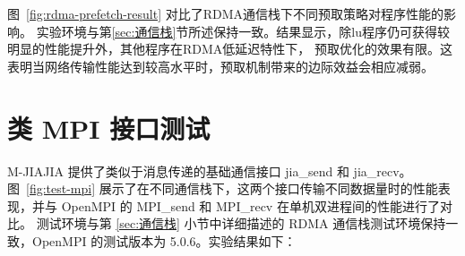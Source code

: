 {    图~\ref{fig:rdma-prefetch-result} 对比了RDMA通信栈下不同预取策略对程序性能的影响。
    实验环境与第\ref{sec:通信栈}节所述保持一致。结果显示，除lu程序仍可获得较明显的性能提升外，其他程序在RDMA低延迟特性下，
    预取优化的效果有限。这表明当网络传输性能达到较高水平时，预取机制带来的边际效益会相应减弱。

    \section{类 MPI 接口测试}\label{sec:类 MPI 接口测试}
    M-JIAJIA 提供了类似于消息传递的基础通信接口 jia\_send 和 jia\_recv。
    图~\ref{fig:test-mpi} 展示了在不同通信栈下，这两个接口传输不同数据量时的性能表现，并与 OpenMPI 的 MPI\_send 和 MPI\_recv 在单机双进程间的性能进行了对比。
    测试环境与第 \ref{sec:通信栈} 小节中详细描述的 RDMA 通信栈测试环境保持一致，OpenMPI 的测试版本为 5.0.6。实验结果如下：

}
